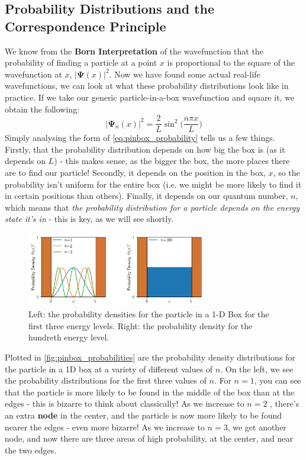 \documentclass{memoir}[11pt,oneside,a4paper,openany]
\newcommand{\wf}{\ensuremath{\bm{\Psi}}\xspace}
\begin{document}
\subsection{Probability Distributions and the Correspondence Principle}
We know from the \textbf{Born Interpretation} of the wavefunction that the probability of finding a particle at a point $x$ is proportional to the square of the wavefunction at $x$, $\lvert \wf(x) \rvert^2$. Now we have found some actual real-life wavefunctions, we can look at what these probability distributions look like in practice. If we take our generic particle-in-a-box wavefunction and square it, we obtain the following:
\begin{equation}\label{eq:pinbox_probability}
	\lvert \wf_n(x) \rvert^2 = \frac{2}{L}\sin^2\bigg(\frac{n\pi x}{L}\bigg)
\end{equation}
Simply analysing the form of \autoref{eq:pinbox_probability} tells us a few things. Firstly, that the probability distribution depends on how big the box is (as it depends on $L$) - this makes sense, as the bigger the box, the more places there are to find our particle! Secondly, it depends on the position in the box, $x$, so the probability isn't uniform for the entire box (i.e. we might be more likely to find it in certain positions than others). Finally, it depends on our quantum number, $n$, which means that \emph{the probability distribution for a particle depends on the energy state it's in} - this is key, as we will see shortly. 
\begin{figure}[h]
	\centering
	\includegraphics[width=0.7\textwidth]{particle_in_box_probabilities}
	\caption{Left: the probability densities for the particle in a 1-D Box for the first three energy levels. Right: the probability density for the hundreth energy level.}\label{fig:pinbox_probabilities}
\end{figure}

Plotted in \autoref{fig:pinbox_probabilities} are the probability density distributions for the particle in a 1D box at a variety of different values of $n$. On the left, we see the probability distributions for the first three values of $n$. For $n=1$, you can see that the particle is more likely to be found in the middle of the box than at the edges - this is bizarre to think about classically! As we increase to $n=2$ , there's an extra \textbf{node} in the center, and the particle is now more likely to be found nearer the edges - even more bizarre! As we increase to $n=3$, we get another node, and now there are three areas of high probability, at the center, and near the two edges.
\end{document}
